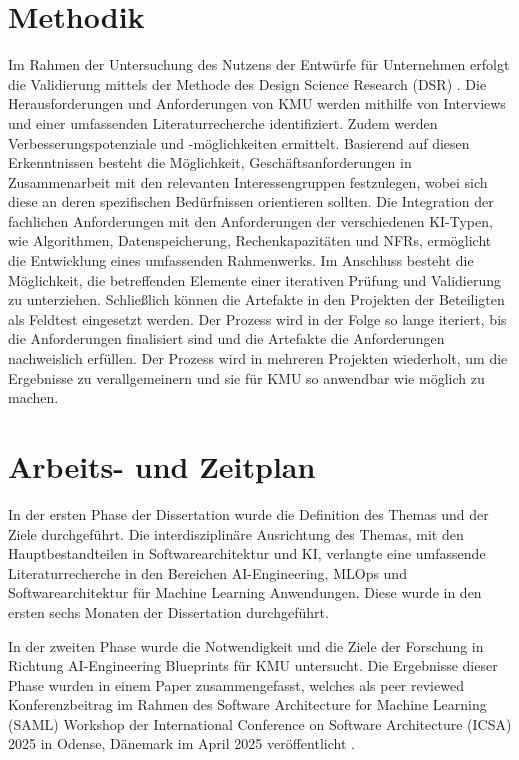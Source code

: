 \documentclass[11pt,a4paper,pointlessnumbers]{scrartcl}
\theoremstyle{break}
\numberwithin{equation}{section}
\begin{document}
\section{Methodik}
Im Rahmen der Untersuchung des Nutzens der Entwürfe für Unternehmen erfolgt die Validierung mittels der Methode des Design Science Research (DSR) \cite{hevnerDesignScienceInformation2004a, ivarssonMethodEvaluatingRigor2011}. Die Herausforderungen und Anforderungen von KMU werden mithilfe von Interviews und einer umfassenden Literaturrecherche identifiziert. Zudem werden Verbesserungspotenziale und -möglichkeiten ermittelt.  Basierend auf diesen Erkenntnissen besteht die Möglichkeit, Geschäftsanforderungen in Zusammenarbeit mit den relevanten Interessengruppen festzulegen, wobei sich diese an deren spezifischen Bedürfnissen orientieren sollten. Die Integration der fachlichen Anforderungen mit den Anforderungen der verschiedenen KI-Typen, wie Algorithmen, Datenspeicherung, Rechenkapazitäten und NFRs, ermöglicht die Entwicklung eines umfassenden Rahmenwerks. Im Anschluss besteht die Möglichkeit, die betreffenden Elemente einer iterativen Prüfung und Validierung zu unterziehen. Schließlich können die Artefakte in den Projekten der Beteiligten als Feldtest eingesetzt werden. Der Prozess wird in der Folge so lange iteriert, bis die Anforderungen finalisiert sind und die Artefakte die Anforderungen nachweislich erfüllen. Der Prozess wird in mehreren Projekten wiederholt, um die Ergebnisse zu verallgemeinern und sie für KMU so anwendbar wie möglich zu machen.

\section{Arbeits- und Zeitplan}
In der ersten Phase der Dissertation wurde die Definition des Themas und der Ziele durchgeführt. Die interdisziplinäre Ausrichtung des Themas, mit den Hauptbestandteilen in Softwarearchitektur und KI, verlangte eine umfassende Literaturrecherche in den Bereichen AI-Engineering, MLOps und Softwarearchitektur für Machine Learning Anwendungen. Diese wurde in den ersten sechs Monaten der Dissertation durchgeführt.

In der zweiten Phase wurde die Notwendigkeit und die Ziele der Forschung in Richtung AI-Engineering Blueprints für KMU untersucht. Die Ergebnisse dieser Phase wurden in einem Paper zusammengefasst, welches als peer reviewed Konferenzbeitrag im Rahmen des Software Architecture for Machine Learning (SAML) Workshop der International Conference on Software Architecture (ICSA) 2025 in Odense, Dänemark im April 2025 veröffentlicht \cite{weeger}.
\end{document}
